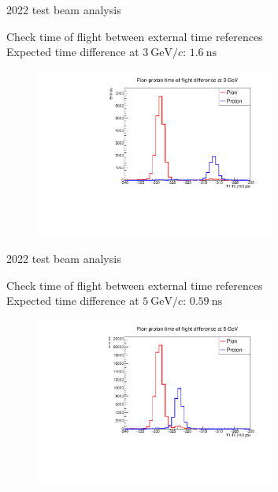 \documentclass[xcolor={dvipsnames}]{beamer}
\begin{document}
\begin{frame}{2022 test beam analysis}
  \vspace{0.0cm}
  \begin{center}
    {\large Check time of flight between external time references}\\
    {\normalsize Expected time difference at $\SI{3}{\giga\eV/c}$: $\SI{1.6}{\nano\second}$}
  \end{center}
  \begin{figure}
    \centering
    \includegraphics[width = 0.7\textwidth]{Figs/PionProton_TimeDiff_3GeV.pdf}
  \end{figure}
\end{frame}

\begin{frame}{2022 test beam analysis}
  \vspace{0.0cm}
  \begin{center}
    {\large Check time of flight between external time references}\\
    {\normalsize Expected time difference at $\SI{5}{\giga\eV/c}$: $\SI{0.59}{\nano\second}$}
  \end{center}
  \begin{figure}
    \centering
    \includegraphics[width = 0.7\textwidth]{Figs/PionProton_TimeDiff_5GeV.pdf}
  \end{figure}
\end{frame}
\end{document}
